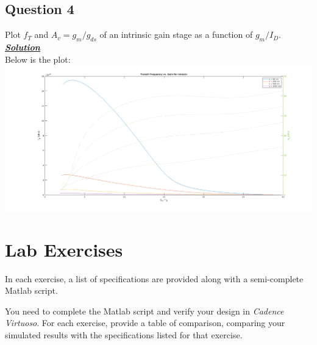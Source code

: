 \documentclass[12pt, fleqn]{article}
\begin{document}
\subsection{Question 4}
Plot $f_T$ and $A_v = g_m / g_{ds}$ of an intrinsic gain stage as a function of $g_m / I_D$.\\[0.5cm]
\underline{\textbf{\textit{Solution}}}\\[0.25cm]
Below is the plot:\\[0.25cm]
\includegraphics[scale=0.35, center]{plot2.PNG}\\
\newpage
\newpage
\section{Lab Exercises}
In each exercise, a list of specifications are provided along with a semi-complete Matlab script.

You need to complete the Matlab script and verify your design in \textit{Cadence Virtuoso}. For each exercise, provide a table of comparison, comparing your simulated results with the specifications listed for that exercise.\\[0.5cm]
\newpage
\end{document}
